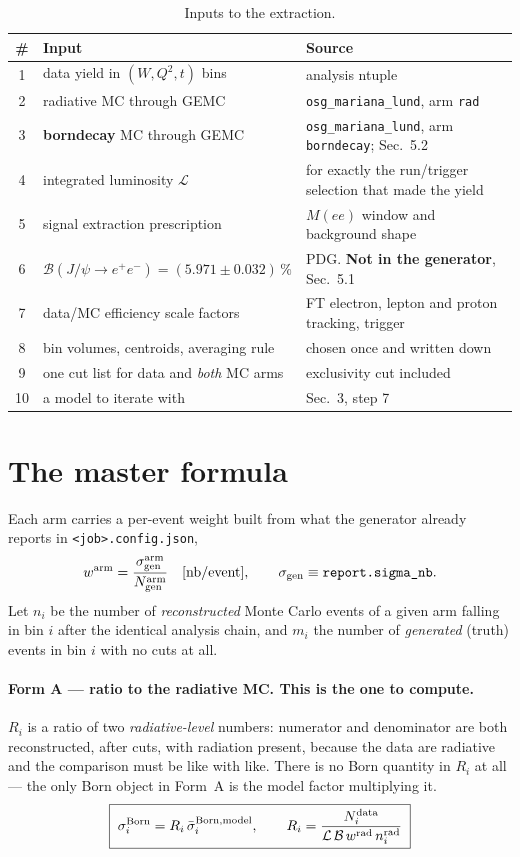 \documentclass[11pt]{article}
\newcommand{\Lum}{\mathcal{L}}
\newcommand{\BR}{\mathcal{B}}
\begin{document}
\begin{table}[H]
\centering\small
\begin{tabular}{clp{7.6cm}}
\toprule
\# & Input & Source \\
\midrule
1 & data yield in $(W,Q^2,t)$ bins & analysis ntuple \\
2 & radiative MC through GEMC & \texttt{osg\_mariana\_lund}, arm \texttt{rad} \\
3 & \textbf{borndecay} MC through GEMC & \texttt{osg\_mariana\_lund}, arm \texttt{borndecay}; Sec.~5.2 \\
4 & integrated luminosity $\Lum$ & for exactly the run/trigger selection that made the yield \\
5 & signal extraction prescription & $M(ee)$ window and background shape \\
6 & $\BR(J/\psi\to e^+e^-)=(5.971\pm0.032)\,\%$ & PDG. \textbf{Not in the generator}, Sec.~5.1 \\
7 & data/MC efficiency scale factors & FT electron, lepton and proton tracking, trigger \\
8 & bin volumes, centroids, averaging rule & chosen once and written down \\
9 & one cut list for data and \emph{both} MC arms & exclusivity cut included \\
10 & a model to iterate with & Sec.~3, step 7 \\
\bottomrule
\end{tabular}
\caption{Inputs to the extraction.}
\label{tab:inputs}
\end{table}

\section{The master formula}

Each arm carries a per-event weight built from what the generator already reports in
\texttt{<job>.config.json},
\begin{equation}
w^{\rm arm}=\frac{\sigma_{\rm gen}^{\rm arm}}{N_{\rm gen}^{\rm arm}}\quad[\mathrm{nb/event}],
\qquad \sigma_{\rm gen}\equiv\texttt{report.sigma\_nb}.
\end{equation}
Let $n_i$ be the number of \emph{reconstructed} Monte Carlo events of a given arm falling in bin $i$
after the identical analysis chain, and $m_i$ the number of \emph{generated} (truth) events in bin
$i$ with no cuts at all.

\paragraph{Form A --- ratio to the radiative MC. This is the one to compute.}
$R_i$ is a ratio of two \emph{radiative-level} numbers: numerator and denominator are both
reconstructed, after cuts, with radiation present, because the data are radiative and the comparison
must be like with like. There is no Born quantity in $R_i$ at all --- the only Born object in Form~A
is the model factor multiplying it.
\begin{equation}
\boxed{\;\sigma_i^{\rm Born}=R_i\,\bar\sigma_i^{\rm Born,model},
\qquad
R_i=\frac{N_i^{\rm data}}{\Lum\,\BR\,w^{\rm rad}\,n_i^{\rm rad}}\;}
\label{eq:formA}
\end{equation}
\end{document}
